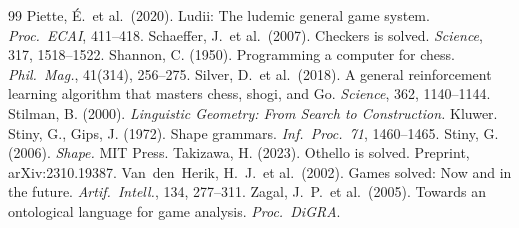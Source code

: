 \documentclass[10pt,twocolumn]{article}
\begin{document}
\begin{thebibliography}{99}
 Piette, \'E.\ et al.\ (2020). Ludii: The ludemic general game system. \textit{Proc.\ ECAI}, 411--418.
 Schaeffer, J.\ et al.\ (2007). Checkers is solved. \textit{Science}, 317, 1518--1522.
 Shannon, C. (1950). Programming a computer for chess. \textit{Phil.\ Mag.}, 41(314), 256--275.
 Silver, D.\ et al.\ (2018). A general reinforcement learning algorithm that masters chess, shogi, and Go. \textit{Science}, 362, 1140--1144.
 Stilman, B. (2000). \textit{Linguistic Geometry: From Search to Construction.} Kluwer.
 Stiny, G., Gips, J. (1972). Shape grammars. \textit{Inf.\ Proc.\ 71}, 1460--1465.
 Stiny, G. (2006). \textit{Shape.} MIT Press.
 Takizawa, H. (2023). Othello is solved. Preprint, arXiv:2310.19387.
 Van~den~Herik, H.\ J.\ et al.\ (2002). Games solved: Now and in the future. \textit{Artif.\ Intell.}, 134, 277--311.
 Zagal, J.\ P.\ et al.\ (2005). Towards an ontological language for game analysis. \textit{Proc.\ DiGRA}.
\end{thebibliography}
\endgroup
\end{document}

